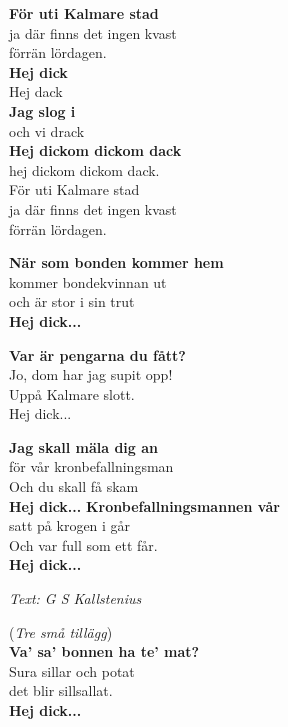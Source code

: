 \vspace{10pt}
\textbf{För uti Kalmare stad}\\
ja där finns det ingen kvast\\
förrän lördagen.\\
\textbf{Hej dick}\\
Hej dack\\
\textbf{Jag slog i}\\
och vi drack\\
\textbf{Hej dickom dickom dack}\\
hej dickom dickom dack.\\
För uti Kalmare stad\\
ja där finns det ingen kvast\\
förrän lördagen.\par
\vspace{10pt}
\revrpt \textbf{När som bonden kommer hem}\\
kommer bondekvinnan ut\rpt\\
och är stor i sin trut\\
\textbf{Hej dick...}\par
\vspace{10pt}
\revrpt \textbf{Var är pengarna du fått?}\\
Jo, dom har jag supit opp!\rpt\\
Uppå Kalmare slott.\\
Hej dick...\par
\vspace{10pt}
\revrpt \textbf{Jag skall mäla dig an}\\
för vår kronbefallningsman\rpt\\
Och du skall få skam\\
\textbf{Hej dick...}
\newpage
\revrpt \textbf{Kronbefallningsmannen vår}\\
satt på krogen i går\rpt\\
Och var full som ett får.\\
\textbf{Hej dick...}\par
\vspace{10pt}
{\footnotesize\textit{Text: G S Kallstenius}}\par
\vspace{10pt}
(\textit{Tre små tillägg})\\
\revrpt \textbf{Va' sa' bonnen ha te' mat?}\\
Sura sillar och potat\rpt\\
det blir sillsallat.\\
\textbf{Hej dick...}\par
